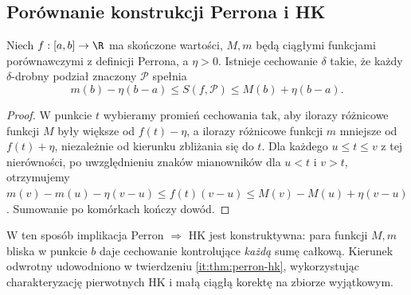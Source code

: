\subsection*{Porównanie konstrukcji Perrona i HK}
\begin{stwierdzenie}\label{st:perron-sumy}
Niech $f:[a,b]\to\R$ ma skończone wartości, $M,m$ będą ciągłymi funkcjami porównawczymi z definicji Perrona, a $\eta>0$. Istnieje cechowanie $\delta$ takie, że każdy $\delta$-drobny podział znaczony $\mathcal P$ spełnia
\[
 m(b)-\eta(b-a)\le S(f,\mathcal P)\le M(b)+\eta(b-a).
\]
\end{stwierdzenie}
\begin{proof}
W punkcie $t$ wybieramy promień cechowania tak, aby ilorazy różnicowe funkcji $M$ były większe od $f(t)-\eta$, a ilorazy różnicowe funkcji $m$ mniejsze od $f(t)+\eta$, niezależnie od kierunku zbliżania się do $t$. Dla każdego $u\le t\le v$ z tej nierówności, po uwzględnieniu znaków mianowników dla $u<t$ i $v>t$, otrzymujemy
$m(v)-m(u)-\eta(v-u)\le f(t)(v-u)\le M(v)-M(u)+\eta(v-u)$. Sumowanie po komórkach kończy dowód.
\end{proof}
W ten sposób implikacja Perron $\Rightarrow$ HK jest konstruktywna: para funkcji $M,m$ bliska w punkcie $b$ daje cechowanie kontrolujące \emph{każdą} sumę całkową. Kierunek odwrotny udowodniono w twierdzeniu \ref{it:thm:perron-hk}, wykorzystując charakteryzację pierwotnych HK i małą ciągłą korektę na zbiorze wyjątkowym.

